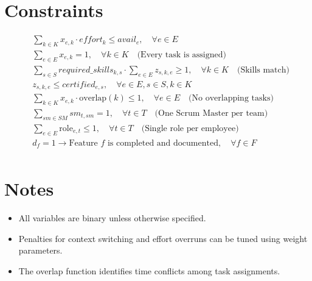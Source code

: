 \documentclass{article}
\begin{document}
\section*{Constraints}
\begin{align*}
& \sum_{k \in K} x_{e,k} \cdot effort_k \leq avail_e, \quad \forall e \in E \\
& \sum_{e \in E} x_{e,k} = 1, \quad \forall k \in K \quad \text{(Every task is assigned)} \\
& \sum_{s \in S} required\_skills_{k,s} \cdot \sum_{e \in E} z_{s,k,e} \geq 1, \quad \forall k \in K \quad \text{(Skills match)} \\
& z_{s,k,e} \leq certified_{e,s}, \quad \forall e \in E, s \in S, k \in K \\
& \sum_{k \in K} x_{e,k} \cdot \text{overlap}(k) \leq 1, \quad \forall e \in E \quad \text{(No overlapping tasks)} \\
& \sum_{sm \in SM} sm_{t,sm} = 1, \quad \forall t \in T \quad \text{(One Scrum Master per team)} \\
& \sum_{e \in E} \text{role}_{e,t} \leq 1, \quad \forall t \in T \quad \text{(Single role per employee)} \\
& d_f = 1 \rightarrow \text{Feature } f \text{ is completed and documented}, \quad \forall f \in F \\
\end{align*}

\section*{Notes}
\begin{itemize}
    \item All variables are binary unless otherwise specified.
    \item Penalties for context switching and effort overruns can be tuned using weight parameters.
    \item The overlap function identifies time conflicts among task assignments.
\end{itemize}
\end{document}
